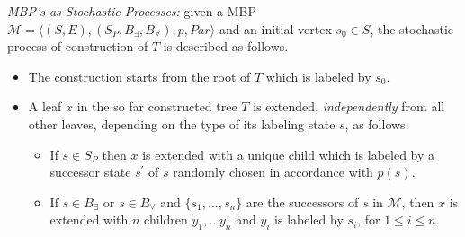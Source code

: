 \vspace{5mm}
\noindent
\emph{MBP's as Stochastic Processes:} given a MBP $\mathcal{M}\!=\!\langle (S,E), (S_{P}, B_\exists,B_\forall), p , Par \rangle$ and an initial vertex $s_0\!\in\! S$, the stochastic process of construction of $T$ is described as follows. 
\begin{itemize}
\item 
The construction starts from the root of $T$ which is labeled by $s_0$. 
\item A leaf $x$ in the so far constructed tree $T$ is extended, \emph{independently} from all other leaves, depending on the type of its labeling state $s$, as follows:
\begin{itemize}
\item If $s\!\in\! S_P$ then $x$ is extended with a unique child which is labeled by a successor state $s^\prime$ of $s$ randomly chosen in accordance with $p(s)$. 
\item If $s\!\in\! B_\exists$ or $s\!\in\! B_\forall$ and $\{s_1,\dots, s_n\}$ are the successors of $s$ in $\mathcal{M}$, then $x$ is extended with $n$ children $y_1,\dots y_n$ and $y_i$ is labeled by $s_i$, for $1\!\leq\! i\! \leq \! n$. 
\end{itemize}
\end{itemize}

